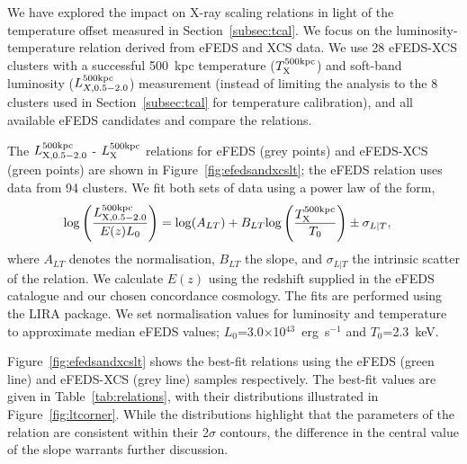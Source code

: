 \documentclass[fleqn,usenatbib]{mnras}
\begin{document}

\label{subsec:LT}
We have explored the impact on X-ray scaling relations in light of the temperature offset measured in Section~\ref{subsec:tcal}.  We focus on the luminosity-temperature relation derived from eFEDS and XCS data.  
We use 28 eFEDS-XCS clusters with a successful 500~kpc temperature ($T^{\rm 500kpc}_{\rm X}$) and soft-band luminosity ($L^{\rm 500kpc}_{X,0.5-2.0}$) measurement (instead of limiting the analysis to the 8 clusters used in Section~\ref{subsec:tcal} for temperature calibration), and all available eFEDS candidates and compare the relations.  

The $L^{500\rm{kpc}}_{\rm{X,0.5-2.0}}$ - $L_{\rm{X}}^{500\rm{kpc}}$ relations for eFEDS (grey points) and eFEDS-XCS (green points) are shown in Figure~\ref{fig:efedsandxcslt}; the eFEDS relation uses data from 94 clusters.
We fit both sets of data using a power law of the form, 
\begin{align}
{\rm log}\left(\frac{L^{500\rm{kpc}}_{\rm{X,0.5-2.0}}}{E(z)L_{0}}\right) &= {\rm log}(A_{LT}) + B_{LT}{\rm log}\left(\frac{T^{\rm{500kpc}}_{\rm{X}}}{T_{0}}\right) \pm \sigma_{L|T},
\label{equ:lt}
\end{align}
where $A_{LT}$ denotes the normalisation, $B_{LT}$ the slope, and $\sigma_{L|T}$ the intrinsic scatter of the relation. We calculate $E(z)$ using the redshift supplied in the eFEDS catalogue and our chosen concordance cosmology. The fits are performed using the LIRA package. We set normalisation values for luminosity and temperature to approximate median eFEDS values;  $L_{0}$=3.0$\times$10$^{43}$~erg~s$^{-1}$ and $T_{0}$=2.3~keV.

Figure~\ref{fig:efedsandxcslt} shows the best-fit relations  using the eFEDS (green line) and eFEDS-XCS (grey line) samples respectively.  The best-fit values are given in Table~\ref{tab:relations}, with their distributions illustrated in Figure~\ref{fig:ltcorner}.  While the distributions highlight that the parameters of the relation are consistent within their 2$\sigma$ contours, the difference in the central value of the slope warrants further discussion.
\end{document}
